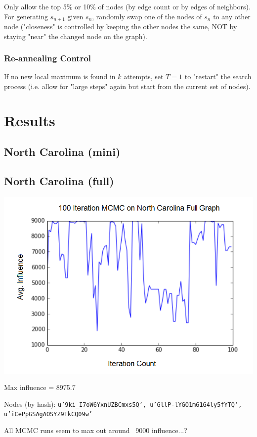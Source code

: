 \documentclass{article}
\begin{document}
	Only allow the top 5\% or 10\% of nodes (by edge count or by edges of neighbors). For generating $s_{n+1}$ given $s_n$, randomly swap one of the nodes of $s_n$ to any other node ("closeness" is controlled by keeping the other nodes the same, NOT by staying "near" the changed node on the graph).
	
	\subsubsection{Re-annealing Control}

	If no new local maximum is found in $k$  attempts, set $T = 1$ to "restart" the search process (i.e. allow for "large steps" again but start from the current set of nodes).
	
	\section{Results}
	\subsection{North Carolina (mini)}
	
	\subsection{North Carolina (full)}
		\includegraphics[scale=0.7]{nc_full_mcmc.png}
		
		Max influence = 8975.7
		
		Nodes (by hash): \texttt{u'9ki\_\-I7oW6YxnUZBCmxs5Q', u'GllP-lYGO1m61G4ly5fYTQ', u'iCePpGSAgAOSYZ9TkCQ09w'}
		
		All MCMC runs seem to max out around ~9000 influence...?
	
	
\end{document}
